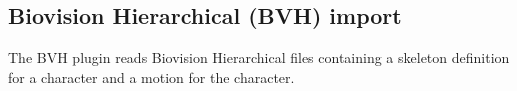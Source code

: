 
\subsection{Biovision Hierarchical (BVH) import}

The BVH plugin reads Biovision Hierarchical files containing a skeleton
definition for a character and a motion for the character.


